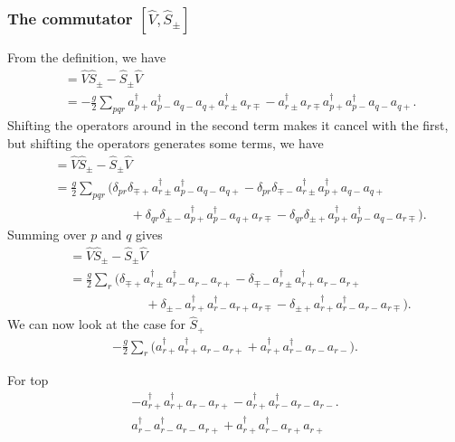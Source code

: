 \documentclass[a4paper, 11pt, notitlepage, english]{article}
\newcommand{\op}[1]{\hat{#1}}
\begin{document}
\subsubsection*{The commutator $[\op{V}, \op{S}_\pm]$}
From the definition, we have
\begin{align*}
[\op{V}, \op{S}_\pm] &= \op{V}\op{S}_\pm - \op{S}_\pm\op{V} \\
&= -\frac{g}{2}\sum_{pqr} a_{p+}^\dagger a_{p-}^\dagger a_{q-} a_{q+} a_{r\pm}^\dagger a_{r\mp} - a_{r\pm}^\dagger a_{r\mp} a_{p+}^\dagger a_{p-}^\dagger a_{q-} a_{q+}.
\end{align*}
Shifting the operators around in the second term makes it cancel with the first, but shifting the operators generates some terms, we have
\begin{align*}
[\op{V}, \op{S}_\pm] &= \op{V}\op{S}_\pm - \op{S}_\pm\op{V} \\
&= \frac{g}{2}\sum_{pqr}
\big(\delta_{pr}\delta_{\mp +}  a_{r\pm}^\dagger a_{p-}^\dagger a_{q-} a_{q+}
- \delta_{pr}\delta_{\mp -} a_{r\pm}^\dagger a_{p+}^\dagger a_{q-} a_{q+} \\[-0.2cm]
&\qquad\qquad\qquad + \delta_{qr}\delta_{\pm -} a_{p+}^\dagger   a_{p-}^\dagger a_{q+} a_{r\mp}
- \delta_{qr} \delta_{\pm +}a_{p+}^\dagger   a_{p-}^\dagger a_{q-} a_{r\mp}\big).
\end{align*}
Summing over $p$ and $q$ gives
\begin{align*}
[\op{V}, \op{S}_\pm] &= \op{V}\op{S}_\pm - \op{S}_\pm\op{V} \\
&= \frac{g}{2}\sum_{r}
\big(\delta_{\mp +} a_{r\pm}^\dagger a_{r-}^\dagger a_{r-} a_{r+}
- \delta_{\mp -} a_{r\pm}^\dagger a_{r+}^\dagger a_{r-} a_{r+} \\[-0.2cm]
&\qquad\qquad\qquad + \delta_{\pm -} a_{r+}^\dagger   a_{r-}^\dagger a_{r+} a_{r\mp}
-  \delta_{\pm +}a_{r+}^\dagger   a_{r-}^\dagger a_{r-} a_{r\mp}\big).
\end{align*}
We can now look at the case for $\op{S}_+$
\begin{align*}
-\frac{g}{2}\sum_{r}
\big(a_{r+}^\dagger a_{r+}^\dagger a_{r-} a_{r+} +
a_{r+}^\dagger   a_{r-}^\dagger a_{r-} a_{r-}\big).
\end{align*}

For top
\begin{align*}
-a_{r+}^\dagger a_{r+}^\dagger a_{r-} a_{r+} - a_{r+}^\dagger   a_{r-}^\dagger a_{r-} a_{r-}. \\
a_{r-}^\dagger a_{r-}^\dagger a_{r-} a_{r+} + a_{r+}^\dagger   a_{r-}^\dagger a_{r+} a_{r+}
\end{align*}
\end{document}
